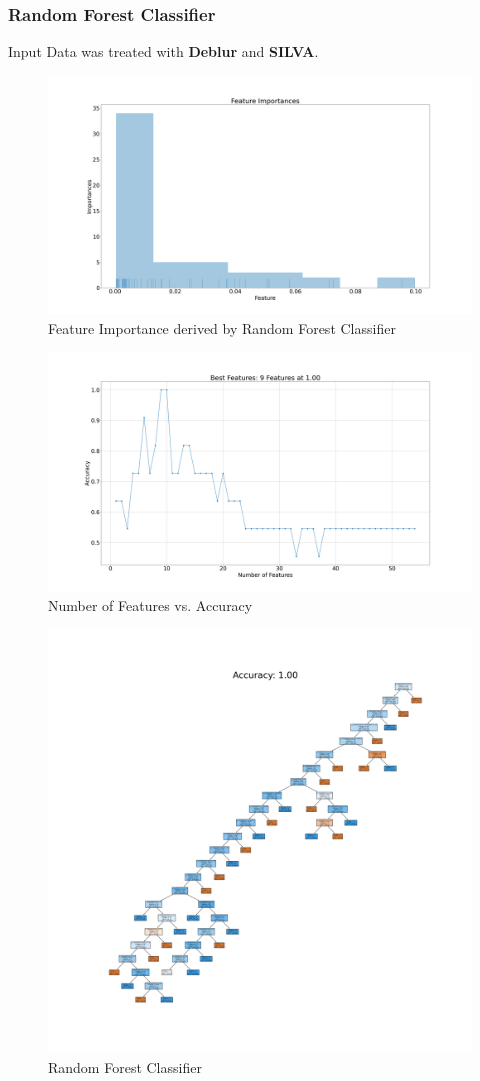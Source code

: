 \documentclass{beamer}
\begin{document}
    \begin{frame}[allowframebreaks]
        \frametitle{Random Forest Classifier}

        Input Data was treated with \textbf{Deblur} and \textbf{SILVA}.

        \begin{figure}[h!]
            \includegraphics[width=0.8 \linewidth]{figures/RandomForest/case1/importances.png}
            \caption{Feature Importance derived by Random Forest Classifier}
        \end{figure}

        \begin{figure}[h!]
            \includegraphics[width=0.8 \linewidth]{figures/RandomForest/case1/scores.png}
            \caption{Number of Features vs. Accuracy}
        \end{figure}

        \begin{figure}[h!]
            \includegraphics[width=0.5 \linewidth]{figures/RandomForest/case1/tree.png}
            \caption{Random Forest Classifier}
        \end{figure}


\end{frame}
\end{document}
